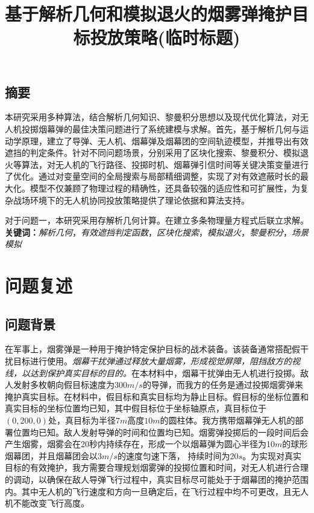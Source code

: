 \documentclass{article}
\title{\large 基于解析几何和模拟退火的烟雾弹掩护目标投放策略(临时标题)}
\date{}
\begin{document}
\maketitle
\begin{center}
\section*{摘要}
\end{center}
\vspace{-1em}


\noindent
本研究采用多种算法，结合解析几何知识、黎曼积分思想以及现代优化算法，对无人机投掷烟幕弹的最佳决策问题进行了系统建模与求解。首先，基于解析几何与运动学原理，建立了导弹、无人机、烟幕弹及烟幕团的空间轨迹模型，并推导出有效遮挡的判定条件。针对不同问题场景，分别采用了区块化搜索、黎曼积分、模拟退火等算法，对无人机的飞行路径、投掷时机、烟幕弹引信时间等关键决策变量进行了优化。通过对变量空间的全局搜索与局部精细调整，实现了对有效遮蔽时长的最大化。模型不仅兼顾了物理过程的精确性，还具备较强的适应性和可扩展性，为复杂战场环境下的无人机协同投放策略提供了理论依据和算法支持。

对于问题一，本研究采用存解析几何计算。在建立多条物理量方程式后联立求解。
\noindent
\textbf{关键词：}\textit{解析几何}，\textit{有效遮挡判定函数}，\textit{区块化搜索}，\textit{模拟退火}，\textit{黎曼积分}，\textit{场景模拟}



\section{问题复述}

\subsection{问题背景}

在军事上，烟雾弹是一种用于掩护特定保护目标的战术装备。该装备通常搭配假干扰目标进行使用。\textit{烟幕干扰弹通过释放大量烟雾，形成视觉屏障，阻挡敌方的视线，以达到保护真实目标的目的。}在本材料中，烟幕干扰弹由无人机进行投掷。敌人发射多枚朝向假目标速度为$300m/s$的导弹，而我方的任务是通过投掷烟雾弹来掩护真实目标。在材料中，假目标和真实目标均为静止目标。假目标的坐标位置和真实目标的坐标位置均已知，其中假目标位于坐标轴原点，真目标位于$(0,200,0)$处，真目标为半径$7m$高度$10m$的圆柱体。我方携带烟幕弹无人机的部署位置均已知。敌人发射导弹的时间和位置均已知。烟雾弹投掷后的一段时间后会产生烟雾，烟雾会在20秒内持续存在，形成一个以烟幕弹为圆心半径为10$m$的球形烟幕团，并且烟幕团会以$3 m/s$的速度匀速下落，
持续时间为20$s$。为实现对真实目标的有效掩护，我方需要合理规划烟雾弹的投掷位置和时间，对无人机进行合理的调动，以确保在敌人导弹飞行过程中，真实目标尽可能处于于烟幕团的掩护范围内。其中无人机的飞行速度和方向一旦确定后，在飞行过程中均不可更改，且无人机不能改变飞行高度。
\end{document}
